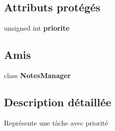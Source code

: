 \subsection*{Attributs protégés}
\begin{DoxyCompactItemize}
\item 
\hypertarget{class_tache_avec_priorite_a812663c068df76d7a8f4c1d486b25262}{unsigned int {\bfseries priorite}}\label{class_tache_avec_priorite_a812663c068df76d7a8f4c1d486b25262}

\end{DoxyCompactItemize}
\subsection*{Amis}
\begin{DoxyCompactItemize}
\item 
\hypertarget{class_tache_avec_priorite_a017a5144e8cfa6087305055ab968ef41}{class {\bfseries Notes\-Manager}}\label{class_tache_avec_priorite_a017a5144e8cfa6087305055ab968ef41}

\end{DoxyCompactItemize}


\subsection{Description détaillée}
Représente une tâche avec priorité 

